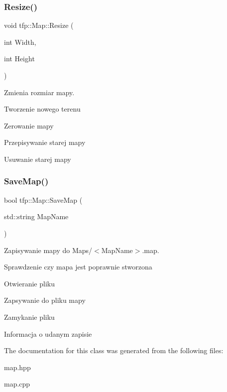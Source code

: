 \subsubsection{\texorpdfstring{Resize()}{Resize()}}
{\footnotesize\ttfamily void tfp\+::\+Map\+::\+Resize (\begin{DoxyParamCaption}\item[{int}]{Width,  }\item[{int}]{Height }\end{DoxyParamCaption})}



Zmienia rozmiar mapy. 

Tworzenie nowego terenu

Zerowanie mapy

Przepisywanie starej mapy

Usuwanie starej mapy \mbox{\label{classtfp_1_1_map_ac717f2886ffd75c4e40df02c41379eb5}} 
\subsubsection{\texorpdfstring{Save\+Map()}{SaveMap()}}
{\footnotesize\ttfamily bool tfp\+::\+Map\+::\+Save\+Map (\begin{DoxyParamCaption}\item[{std\+::string}]{Map\+Name }\end{DoxyParamCaption})}



Zapisywanie mapy do Maps/$<$\+Map\+Name$>$.map. 

Sprawdzenie czy mapa jest poprawnie stworzona

Otwieranie pliku

Zapsywanie do pliku mapy

Zamykanie pliku

Informacja o udanym zapisie 

The documentation for this class was generated from the following files\+:\begin{DoxyCompactItemize}
\item 
map.\+hpp\item 
map.\+cpp\end{DoxyCompactItemize}
